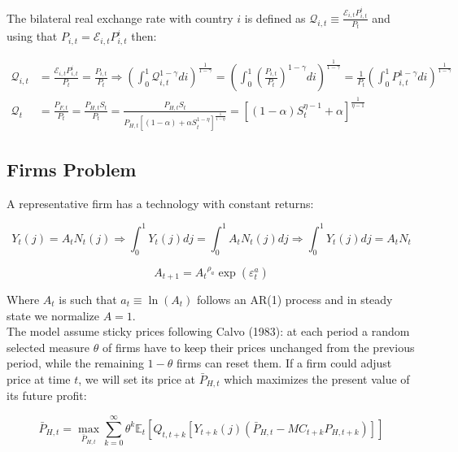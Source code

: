 \documentclass{article}
\newcommand{\Et}{\mathbb{E}_t}
\newcommand{\E}{\mathcal{E}}
\begin{document}
The bilateral real exchange rate with country $i$ is defined as $\mathcal{Q}_{i,t} \equiv \frac{\E_{i,t} P^i_{i,t}}{P_t}$ and using that $P_{i,t} = \E_{i,t} P^i_{i,t}$ then:

\begin{equation}
\label{real_rate}
\begin{split}
\mathcal{Q}_{i,t} & = \frac{\E_{i,t} P^i_{i,t}}{P_t} = \frac{P_{i,t}}{P_t} \Rightarrow \left( \int^1_0 \mathcal Q_{i,t}^{1-\gamma} di \right)^{\frac{1}{1-\gamma}} = \left( \int^1_0 \left(\frac{P_{i,t}}{P_t}\right)^{1-\gamma} di \right)^{\frac{1}{1-\gamma}} = \frac{1}{P_t}\left( \int^1_0 P_{i,t}^{1-\gamma} di \right)^{\frac{1}{1-\gamma}} \\
\mathcal{Q}_{t} & = \frac{P_{F,t}}{P_t} = \frac{P_{H,t} S_t}{P_t} = \frac{P_{H,t} S_t}{P_{H,t} \left[(1-\alpha) + \alpha S_t^{1-\eta} \right]^{\frac{1}{1-\eta}}} = \left[(1-\alpha)S_t^{\eta-1} + \alpha \right]^{\frac{1}{\eta-1}}
\end{split}
\end{equation}


\subsection{Firms Problem}
A representative firm has a technology with constant returns:

\begin{equation}
    \label{technology}
    Y_t(j) = A_t N_t(j) \Rightarrow \int^1_0 Y_t(j) dj = \int^1_0 A_t N_t(j) dj \Rightarrow \int^1_0 Y_t(j) dj = A_t N_t 
\end{equation}

\begin{equation}
    \label{tfp}
    A_{t+1} = {A_t}^{\rho_a}\exp( \varepsilon^a_t)
\end{equation}

Where $A_t$ is such that $a_t \equiv \ln(A_t)$ follows an AR(1) process and in steady state we normalize $A = 1$.\\

The model assume sticky prices following Calvo (1983): at each period a random selected measure $\theta$ of firms have to keep their prices unchanged from the previous period, while the remaining $1-\theta$ firms can reset them. If a firm could adjust price at time $t$, we will set its price at $\bar P_{H,t}$ which maximizes the present value of its future profit:

\begin{equation}
    \bar P_{H,t} = \max_{\bar P_{H,t}} \sum^\infty_{k=0} \theta^k \Et \left[ Q_{t, t+k}[Y_{t+k}(j) (\bar P_{H,t} - MC_{t+k} P_{H,t+k})] \right]
\end{equation}
\end{document}
